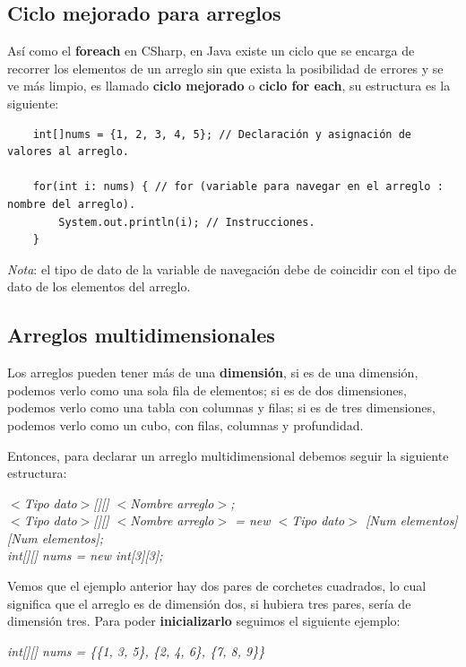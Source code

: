 \subsection{Ciclo mejorado para arreglos}
\hspace{0.55cm}Así como el \textbf{foreach} en CSharp, en Java existe un ciclo que se encarga de recorrer los elementos de un arreglo sin que exista la posibilidad de errores y se ve más limpio, es llamado \textbf{ciclo mejorado} o \textbf{ciclo for each}, su estructura es la siguiente:
\begin{lstlisting}
    int[]nums = {1, 2, 3, 4, 5}; // Declaración y asignación de valores al arreglo.
        
    for(int i: nums) { // for (variable para navegar en el arreglo : nombre del arreglo).
        System.out.println(i); // Instrucciones.
    }
\end{lstlisting}

\textit{Nota}: el tipo de dato de la variable de navegación debe de coincidir con el tipo de dato de los elementos del arreglo.


\subsection{Arreglos multidimensionales}
\hspace{0.55cm}Los arreglos pueden tener más de una \textbf{dimensión}, si es de una dimensión, podemos verlo como una sola fila de elementos; si es de dos dimensiones, podemos verlo como una tabla con columnas y filas; si es de tres dimensiones, podemos verlo como un cubo, con filas, columnas y profundidad.

Entonces, para declarar un arreglo multidimensional debemos seguir la siguiente estructura:
\begin{center}
	\textit{
		$<$Tipo dato$>$[][] $<$Nombre arreglo$>$; \\
		$<$Tipo dato$>$[][] $<$Nombre arreglo$>$ = new $<$Tipo dato$>$ [Num elementos][Num elementos]; \\
		int[][] nums = new int[3][3];
	}
\end{center}

Vemos que el ejemplo anterior hay dos pares de corchetes cuadrados, lo cual significa que el arreglo es de dimensión dos, si hubiera tres pares, sería de dimensión tres. Para poder \textbf{inicializarlo} seguimos el siguiente ejemplo:
\begin{center}
	\textit{int[][] nums = \{\{1, 3, 5\}, \{2, 4, 6\}, \{7, 8, 9\}\}}
\end{center}

